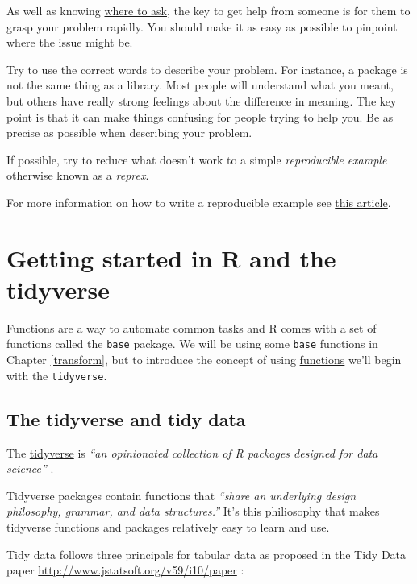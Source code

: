 \documentclass[12pt,]{book}
\begin{document}
As well as knowing \href{https://www.tidyverse.org/help/\#where-to-ask}{where to ask}, the key to get help
from someone is for them to grasp your problem rapidly. You
should make it as easy as possible to pinpoint where the issue might be.

Try to use the correct words to describe your problem. For instance, a
package is not the same thing as a library. Most people will understand
what you meant, but others have really strong feelings about the difference
in meaning. The key point is that it can make things confusing for people
trying to help you. Be as precise as possible when describing your problem.

If possible, try to reduce what doesn't work to a simple \emph{reproducible
example} otherwise known as a \emph{reprex}.

For more information on how to write a reproducible example see
\href{https://www.tidyverse.org/help/\#reprex}{this article}.

\hypertarget{tidyverse}{%
\chapter{Getting started in R and the tidyverse}\label{tidyverse}}

Functions are a way to automate common tasks and R comes with a set of functions
called the \texttt{base} package. We will be using some \texttt{base} functions in
Chapter \ref{transform}, but to introduce the concept of using \protect\hyperlink{function-anatomy}{functions}
we'll begin with the \texttt{tidyverse}.

\hypertarget{the-tidyverse-and-tidy-data}{%
\section{The tidyverse and tidy data}\label{the-tidyverse-and-tidy-data}}

The \href{https://www.tidyverse.org/}{tidyverse} \citep{R-tidyverse} is \emph{``an opinionated
collection of R packages designed for data science''} .

Tidyverse packages contain functions that \emph{``share an underlying design
philosophy, grammar, and data structures.''} It's this philiosophy that makes
tidyverse functions and packages relatively easy to learn and use.

Tidy data follows three principals for tabular data as proposed in the Tidy Data
paper \url{http://www.jstatsoft.org/v59/i10/paper} :
\end{document}
